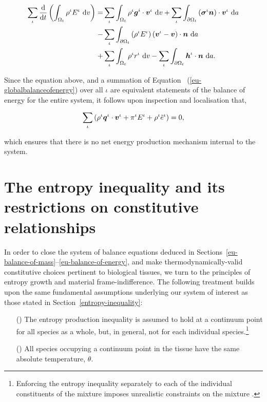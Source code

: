 \begin{equation}
\begin{split}
\sum\limits_{\iota}
\frac{\mathrm{d}}{\mathrm{d}t}\left(\int_{\Omega_{t}} \rho^{\iota}
E^{\iota}\ \mathrm{d}v \right) = & \sum\limits_{\iota}
\int_{\Omega_{t}} \rho^{\iota} \mbox{\boldmath$ g$}^i\cdot\mbox{\boldmath$ v$}^{\iota}\ \mathrm{d}v +
\sum\limits_{\iota} \int_{\partial \Omega_{t}}
\left(\mbox{\boldmath$\sigma$}^{\iota}\mbox{\boldmath$ n$}\right)\cdot\mbox{\boldmath$ v$}^{\iota}\ \mathrm{d}a\\ -&
\sum\limits_{\iota} \int_{\partial \Omega_{t}} \left(\rho^{\iota}
E^{\iota} \right) \left(\mbox{\boldmath$ v$}^{\iota} - \mbox{\boldmath$ v$}\right) \cdot
\mbox{\boldmath$ n$}\ \mathrm{d}a \\ + & \sum\limits_{\iota} \int_{\Omega_{t}}
\rho^{\iota} r^{\iota}\ \mathrm{d}v - \sum\limits_{\iota}
\int_{\partial \Omega_{t}} \mbox{\boldmath$ h$}^{\iota}\cdot\mbox{\boldmath$ n$}\ \mathrm{d}a.
\end{split}
\label{eu-energyexternal}
\end{equation}
 
\noindent Since the equation above, and a summation of Equation~%
(\ref{eu-globalbalanceofenergy}) over all $\iota$ are equivalent
statements of the balance of energy for the entire system, it follows
upon inspection and localisation that,

\begin{equation}
 \sum\limits_{\iota} \left( \rho^{\iota}\mbox{\boldmath$ q$}^{\iota}\cdot\mbox{\boldmath$ v$}^{\iota} +
 \pi^{\iota} E^{\iota} + \rho^{\iota}\tilde{e}^{\iota} \right) = 0,
\label{eu-summationrelationenergy}
\end{equation}

\noindent which ensures that there is no net energy production
mechanism internal to the system.

\section{The entropy inequality and its restrictions on constitutive
  relationships}
\label{eu-entropy-inequality}

In order to close the system of balance equations deduced in
Sections~\ref{eu-balance-of-mass}--\ref{eu-balance-of-energy}, and
make thermodynamically-valid constitutive choices pertinent to
biological tissues, we turn to the principles of entropy growth and
material frame-indifference. The following treatment builds upon the
same fundamental assumptions underlying our system of interest as
those stated in Section~\ref{entropy-inequality}:

\begin{enumerate}
\item[(\romannumeral 1)] The entropy production inequality is assumed
  to hold at a continuum point for all species as a whole, but, in
  general, not for each individual species.\footnote{Enforcing the
    entropy inequality separately to each of the individual
    constituents of the mixture imposes unrealistic constraints on the
    mixture \citep{BedfordDrumheller:1983}.}
\item[(\romannumeral 2)] All species occupying a continuum point in
  the tissue have the same absolute temperature, $\theta$.
\end{enumerate} 

